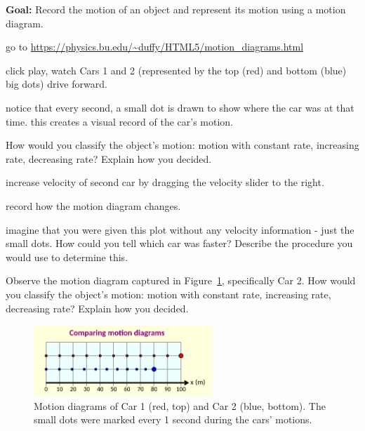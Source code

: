 \textbf{Goal:} Record the motion of an object and represent its motion using a motion diagram.

\begin{steps}
	\item go to \url{https://physics.bu.edu/~duffy/HTML5/motion_diagrams.html}
	
	\item click play, watch Cars 1 and 2 (represented by the top (red) and bottom (blue) big dots) drive forward.
	
	\item notice that every second, a small dot is drawn to show where the car was at that time. this creates a visual record of the car's motion.
	
	\item How would you classify the object’s motion: motion with constant rate, increasing rate, decreasing rate? Explain how you decided.
	
	\item increase velocity of second car by dragging the velocity slider to the right.
	
	\item record how the motion diagram changes.
	
	\item imagine that you were given this plot without any velocity information - just the small dots. How could you tell which car was faster? Describe the procedure you would use to determine this.

	\item Observe the motion diagram captured in Figure\ \ref{fm1:fig:slowing}, specifically Car 2. How would you classify the object’s motion: motion with constant rate, increasing rate, decreasing rate? Explain how you decided.
	
\end{steps}

\begin{figure}
	\centering
	\includegraphics[width=0.6\textwidth]{force-motion-1/motion-diagrams-slowing.png}
	\caption{Motion diagrams of Car 1 (red, top) and Car 2 (blue, bottom). The small dots were marked every 1 second during the cars' motions.}\label{fm1:fig:slowing}
\end{figure}

